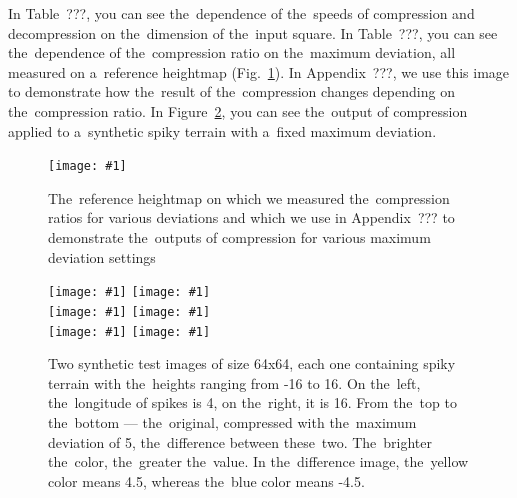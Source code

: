 In Table~???, you can see the~dependence of the~speeds of compression and decompression on the~dimension of the~input square. In Table~???, you can see the~dependence of the~compression ratio on the~maximum deviation, all measured on a~reference heightmap (Fig.~\ref{fig:ref_map}). In Appendix~???, we use this image to demonstrate how the~result of the~compression changes depending on the~compression ratio. In Figure~\ref{fig:result_wave_samples}, you can see the~output of compression applied to a~synthetic spiky terrain with a~fixed maximum deviation.

\newcommand{\hspaceimg}{\hspace{0.05cm}}
\newcommand{\vspaceimg}{\vspace{0.15cm}}
\newcommand{\incexamplsolo}[1]{\texttt{[image: \#1]}}

\begin{figure}
	\begin{center}
	\incexamplsolo{figures/samp_orig.png} \\ \vspaceimg
	\end{center}
	\caption{The~reference heightmap on which we measured the~compression ratios for various deviations and which we use in Appendix~??? to demonstrate the~outputs of compression for various maximum deviation settings}
	\label{fig:ref_map}
\end{figure}

\newcommand{\incexamplpair}[1]{\texttt{[image: \#1]}}

\begin{figure}
	\begin{center}
	\incexamplpair{figures/dim_64_amp_16_lon_4_horizontal_orig.png} \hspaceimg
	\incexamplpair{figures/dim_64_amp_16_lon_16_horizontal_orig.png} \\ \vspaceimg
	\incexamplpair{figures/dim_64_amp_16_lon_4_horizontal_out.png} \hspaceimg
	\incexamplpair{figures/dim_64_amp_16_lon_16_horizontal_out.png} \\ \vspaceimg
	\incexamplpair{figures/dim_64_amp_16_lon_4_horizontal_diff.png} \hspaceimg
	\incexamplpair{figures/dim_64_amp_16_lon_16_horizontal_diff.png}
    \end{center}
	\caption{Two synthetic test images of size 64x64, each one containing spiky terrain with the~heights ranging from -16 to 16. On the~left, the~longitude of spikes is 4, on the~right, it is 16. From the~top to the~bottom --- the~original, compressed with the~maximum deviation of 5, the~difference between these~two. The~brighter the~color, the~greater the~value. In the~difference image, the~yellow color means 4.5, whereas the~blue color means -4.5.}
	\label{fig:result_wave_samples}
\end{figure}

